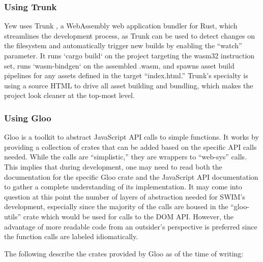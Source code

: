 \documentclass[
    paper=letter,
    parskip=half,
    fontsize=12pt,
    titlepage=firstiscover,
    toc=bibliography,
    numbers=endperiod
]{scrartcl}
\begin{document}
\subsubsection{Using Trunk}

Yew uses Trunk \cite{trunk}, a WebAssembly web application bundler for Rust, which
streamlines the development process, as Trunk can be used to detect
changes on the filesystem and automatically trigger new builds by
enabling the ``watch'' parameter. It runs `cargo build` on the project
targeting the wasm32 instruction set, runs `wasm-bindgen` on the
assembled .wasm, and spawns asset build pipelines for any assets defined
in the target ``index.html.'' Trunk's specialty is using a source HTML
to drive all asset building and bundling, which makes the project look
cleaner at the top-most level.

\subsubsection{Using Gloo}

Gloo \cite{gloo} is a toolkit to abstract JavaScript API calls to simple functions.
It works by providing a collection of crates that can be added based on
the specific API calls needed. While the calls are ``simplistic,'' they
are wrappers to ``web-sys'' calls. This implies that during development,
one may need to read both the documentation for the specific Gloo crate
and the JavaScript API documentation to gather a complete understanding
of its implementation. It may come into question at this point the
number of layers of abstraction needed for SWIM's development,
especially since the majority of the calls are housed in the
``gloo-utils'' crate which would be used for calls to the DOM API.
However, the advantage of more readable code from an outsider's
perspective is preferred since the function calls are labeled
idiomatically.

The following describe the crates provided by Gloo as of the time of
writing:
\end{document}
